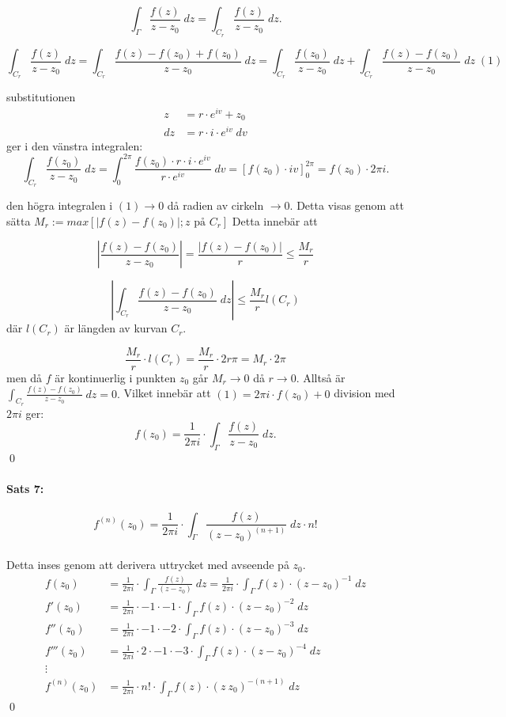 \documentclass{article}
\begin{document}
\[ \int_\Gamma \frac {f(z)} {z - z_0} \; dz = \int_{C_r} \frac {f(z)} {z - z_0} \; dz. \]

\[ \int_{C_r} \frac {f(z)} {z - z_0} \; dz = \int_{C_r} \frac {f(z) - f(z_0) + f(z_0)} {z - z_0} \; dz =
	\int_{C_r} \frac {f(z_0)} {z - z_0} \; dz + \int_{C_r} \frac {f(z) - f(z_0)} {z - z_0} \; dz \;(1) \]

substitutionen 
\begin{align*}
	z  &= r \cdot e^{iv} + z_0 \\
	dz &= r \cdot i \cdot e^{iv} \; dv
\end{align*}
ger i den vänstra integralen:
\[ \int_{C_r} \frac {f(z_0)} {z - z_0} \; dz = \int_0^{2\pi} \frac {f(z_0) \cdot r \cdot i \cdot e^{iv} } { r \cdot e^{iv}} \; dv =
	\left [f(z_0) \cdot iv \right ]_0^{2\pi} = f(z_0) \cdot 2 \pi i. \]

den högra integralen i $(1) \rightarrow 0$ då radien av cirkeln $\rightarrow 0$.
Detta visas genom att sätta $M_r := max [|f(z) - f(z_0)|; z \text{ på } C_r]$
Detta innebär att

\[
	\left | \frac {f(z) - f(z_0)} {z - z_0} \right | = \frac {|f(z) - f(z_0)|} {r} \leq \frac {M_r} {r}
\]

\[
	\left | \int_{C_r} \frac {f(z) - f(z_0)} {z - z_0} \; dz \right | \leq \frac {M_r} {r} l(C_r)
\]
där $l(C_r)$ är längden av kurvan $C_r$.

\[
\frac {M_r} {r} \cdot l(C_r) = \frac {M_r} {r} \cdot 2r\pi = M_r \cdot 2 \pi
\]
men då $f$ är kontinuerlig i punkten $z_0$ går $M_r \rightarrow 0$ då $r \rightarrow 0$.
Alltså är $\int_{C_r} \frac {f(z) - f(z_0)} {z - z_0} \; dz = 0.$ Vilket innebär att $(1) = 2\pi i \cdot f(z_0) + 0$
division med $2\pi i$ ger:
\[
	f(z_0) = \frac {1} {2 \pi i} \cdot \int_{\Gamma} \frac {f(z)} {z - z_0} \; dz.
\]
\hfill \qed
\\

\paragraph{Sats 7:}
\[
	f^{(n)}(z_0) = \frac {1} {2 \pi i} \cdot \int_{\Gamma} \frac {f(z)} {(z - z_0)^{(n + 1)}} \; dz \cdot n!
\]
\\
Detta inses genom att derivera uttrycket med avseende på $z_0$.
\begin{align*}
	f(z_0) &= \frac {1} {2 \pi i} \cdot \int_{\Gamma} \frac {f(z)} {(z - z_0)} \; dz = \frac {1} {2 \pi i} \cdot \int_{\Gamma}
		f(z) \cdot (z - z_0)^{-1} \; dz \\
	f'(z_0) &= \frac {1} {2 \pi i} \cdot -1 \cdot -1 \cdot \int_{\Gamma} f(z) \cdot (z - z_0)^{-2} \; dz \\
	f''(z_0) &= \frac {1} {2 \pi i} \cdot -1 \cdot -2 \cdot \int_{\Gamma} f(z) \cdot (z - z_0)^{-3} \; dz \\
	f'''(z_0) &= \frac {1} {2 \pi i} \cdot 2 \cdot -1 \cdot -3 \cdot \int_{\Gamma} f(z) \cdot (z - z_0)^{-4} \; dz \\
	\vdots \\
	f^{(n)}(z_0) &= \frac {1} {2 \pi i} \cdot n! \cdot \int_\Gamma f(z) \cdot (z \ z_0)^{-(n + 1)} \; dz
\end{align*} %
\hfill \qed
\\
\end{document}
